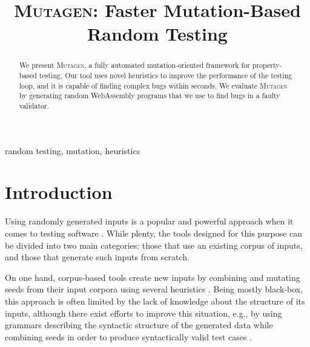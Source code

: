 \documentclass[10pt,conference]{IEEEtran}
\newcommand{\ourtool}{\textsc{Mutagen}\xspace}
\begin{document}
\title{\ourtool: Faster Mutation-Based Random Testing}

\author{
}

\maketitle


\begin{abstract}
We present \ourtool, a fully automated mutation-oriented framework for
property-based testing.
%
Our tool uses novel heuristics to improve the performance of the testing loop,
and it is capable of finding complex bugs within seconds.
%
We evaluate \ourtool by generating random WebAssembly programs that we use to
find bugs in a faulty validator.
\end{abstract}


\begin{IEEEkeywords}
random testing, mutation, heuristics
\end{IEEEkeywords}


\section{Introduction}

%
Using randomly generated inputs is a popular and powerful approach when it comes
to testing software \cite{duran1984evaluation}.
%
While plenty, the tools designed for this purpose can be divided into two main
categories: those that use an existing corpus of inputs, and those that generate
such inputs from scratch.

%
On one hand, corpus-based tools create new inputs by combining and mutating
seeds from their input corpora using several heuristics
\cite{zalewski2014american, swiecki2017honggfuzz}.
%
Being mostly black-box, this approach is often limited by the lack of knowledge
about the structure of its inputs, although there exist efforts to improve this
situation, e.g., by using grammars describing the syntactic structure of the
generated data while combining seeds in order to produce syntactically valid
test cases \cite{miller2007analysis, wang2019superion, holler2012fuzzing}.
\end{document}
